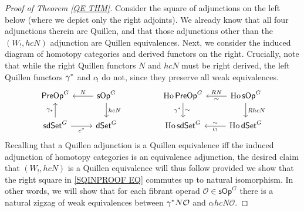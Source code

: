 \documentclass[a4paper,10pt]{article}%
\numberwithin{equation}{section}
\numberwithin{figure}{section}
\theoremstyle{definition} %
\DeclareMathOperator{\Ho}{Ho}
\renewcommand{\O}{\ensuremath{\mathcal O}}
\newcommand{\1}{\ensuremath{\mathbbm 1}}%
\begin{document}
\begin{proof}[Proof of Theorem \ref{QE THM}]
Consider the square of adjunctions on the left below 
(where we depict only the right adjoints).
We already know that all four adjunctions therein are Quillen,
and that those adjunctions other than the
$(W_!,hcN)$
adjunction are Quillen equivalences.
Next, 
we consider the induced diagram of homotopy categories
and derived functors on the right.
Crucially,
note that while 
the right Quillen functors $N$ and $hcN$
must be right derived, 
the left Quillen functors $\gamma^{\**}$ and $c_!$ do not, 
since they preserve all weak equivalences.
\begin{equation}\label{SQINPROOF EQ}
\begin{tikzcd}
	\mathsf{PreOp}^G 
&
	\mathsf{sOp}^G 
	\ar{l}[swap]{N}
	\ar{d}{hcN}
&&%
	\Ho \mathsf{PreOp}^G 
	\ar{d}[swap]{\gamma^{\**}}{\sim}
&
	\Ho \mathsf{sOp}^G 
	\ar{l}[swap]{R N}{\sim}
	\ar{d}{R hcN}
\\
	\mathsf{sdSet}^G
	\ar{u}{\gamma_{\**}}
	\ar{r}[swap]{c^{\**}}
&
	\mathsf{dSet}^G
&&%
	\Ho \mathsf{sdSet}^G
&
	\Ho \mathsf{dSet}^G
	\ar{l}{c_!}[swap]{\sim}
\end{tikzcd}
\end{equation}
Recalling that a Quillen adjunction
is a Quillen equivalence iff the induced adjunction of homotopy categories is an equivalence adjunction,
the desired claim that
$(W_!,hcN)$ is a Quillen equivalence will thus follow
provided we show that the right square in 
\eqref{SQINPROOF EQ}
commutes up to natural isomorphism.
In other words, we will show that
for each fibrant operad
$\O \in \mathsf{sOp}^G$
there is a natural zigzag of weak equivalences between 
$\gamma^{\**} N \O$ and
$c_! hcN \O$.


\end{proof}
\end{document}
